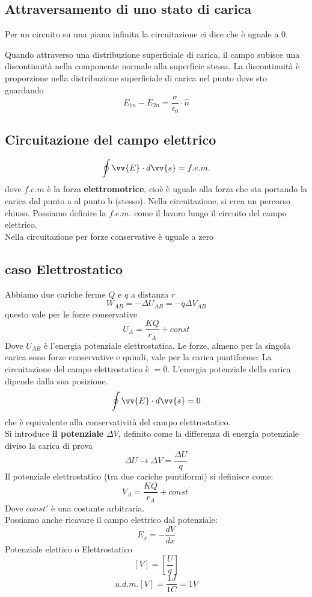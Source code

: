 \documentclass[a4paper]{report}
\begin{document}
  \subsection{Attraversamento di uno stato di carica}
  Per un circuito su una piana infinita la circuitazione ci dice che è uguale a 0.

  Quando attraverso una distribuzione superficiale di carica, il campo subisce una discontinuità nella componente normale alla superficie stessa. La discontinuità è proporzione nella distribuzione superficiale di carica nel punto dove sto guardando\\
  $$ E_{1n} - E_{2n} = \frac{\sigma}{\epsilon_0} \cdot \hat{n}$$


  \subsection{Circuitazione del campo elettrico}
  $$\oint \vv{E} \cdot d\vv{s} = f.e.m.$$
  dove $f.e.m$ è la forza \textbf{elettromotrice}, cioè è uguale alla forza che sta portando la carica dal punto a al punto b (stesso).
  Nella circuitazione, si crea un percorso chiuso. Possiamo definire la $f.e.m.$ come il lavoro lungo il circuito del campo elettrico.\\
  Nella circuitazione per forze conservative è uguale a zero

  \subsection{caso Elettrostatico}
  Abbiamo due cariche ferme $Q$ e $q$ a distanza $r$
  $$ W_{AB} = - \Delta U_{AB} = -q \Delta V_{AB}$$
  questo vale per le forze conservative
  $$ U_{A} = \frac{KQ}{r_A} + const $$
  Dove $U_{AB}$ è l'energia potenziale elettrostatica. Le forze, almeno per la singola carica sono forze conservative e quindi, vale per la carica puntiforme: La circuitazione del campo elettrostatico è $=0$.
  L'energia potenziale della carica dipende dalla sua posizione.
  $$ \oint \vv{E} \cdot d\vv{s} = 0 $$
  che è equivalente alla conservatività del campo elettrostatico.\\
  Si introduce \textbf{il potenziale} $\Delta V$, definito come la differenza di energia potenziale diviso la carica di prova
  $$ \Delta U \longrightarrow \Delta V = \frac{\Delta U}{q} $$
  Il potenziale elettrostatico (tra due cariche puntiformi) si definisce come:
  $$ V_A = \frac{KQ}{r_A} + const^{'}$$
  Dove $const'$ è una costante arbitraria.\\
  Possiamo anche ricavare il campo elettrico dal potenziale:
  $$ E_x = -\frac{dV}{dx}$$
  Potenziale elettico o Elettrostatico
  $$ [V] = [\frac{U}{q}]$$
  $$u.d.m.[V] = \frac{1J}{1C} = 1V$$
\end{document}
